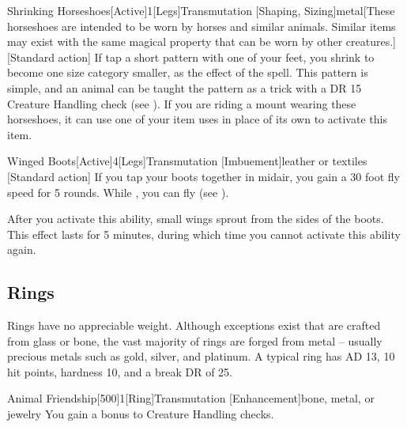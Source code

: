         \begin{magicitemdef}{Shrinking Horseshoes}[Active]{1}[Legs]{Transmutation [Shaping, Sizing]}{metal}[These horseshoes are intended to be worn by horses and similar animals. Similar items may exist with the same magical property that can be worn by other creatures.]
            [Standard action] If tap a short pattern with one of your feet, you shrink to become one size category smaller, as the effect of the  spell.
            This pattern is simple, and an animal can be taught the pattern as a trick with a DR 15 Creature Handling check (see ).
            If you are riding a mount wearing these horseshoes, it can use one of your item uses in place of its own to activate this item.
        \end{magicitemdef}

        \begin{magicitemdef}{Winged Boots}[Active]{4}[Legs]{Transmutation [Imbuement]}{leather or textiles}
            [Standard action] If you tap your boots together in midair, you gain a 30 foot fly speed for 5 rounds.
            While \unencumbered, you can fly (see ).

            After you activate this ability, small wings sprout from the sides of the boots.
            This effect lasts for 5 minutes, during which time you cannot activate this ability again.
        \end{magicitemdef}

    \subsection{Rings}

         Rings have no appreciable weight.
        Although exceptions exist that are crafted from glass or bone, the vast majority of rings are forged from metal -- usually precious metals such as gold, silver, and platinum.
        A typical ring has AD 13, 10 hit points, hardness 10, and a break DR of 25.

        \begin{magicitemdef}{Animal Friendship}[500]{1}[Ring]{Transmutation [Enhancement]}{bone, metal, or jewelry}
             You gain a  bonus to Creature Handling checks.
        \end{magicitemdef}

